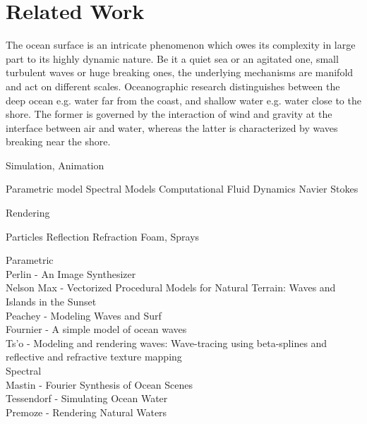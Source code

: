\chapter{Related Work}
\label{ch:state_of_the_art}

The ocean surface is an intricate phenomenon which owes its complexity in large part
to its highly dynamic nature. Be it a quiet sea or an agitated one, small turbulent waves
or huge breaking ones, the underlying mechanisms are manifold and act on different scales.
Oceanographic research distinguishes between the deep ocean e.g. water far from the coast,
and shallow water e.g. water close to the shore.  The former is governed by the interaction
of wind and gravity at the interface between air and water, whereas the latter is
characterized by waves breaking near the shore.

Simulation, Animation

Parametric model
Spectral Models
Computational Fluid Dynamics
Navier Stokes

Rendering

Particles
Reflection
Refraction
Foam, Sprays

Parametric\\
Perlin - An Image Synthesizer \cite{Perlin:1985}\\
Nelson Max - Vectorized Procedural Models for Natural Terrain: Waves and Islands in the Sunset \cite{Max:1981}\\
Peachey - Modeling Waves and Surf \cite{Peachey:1986}\\
Fournier - A simple model of ocean waves \cite{Fournier:1986}\\
Ts'o - Modeling and rendering waves: Wave-tracing using beta-splines and reflective and refractive texture mapping \cite{Ts'o:1987}\\

Spectral\\
Mastin - Fourier Synthesis of Ocean Scenes \cite{Mastin:1987}\\
Tessendorf - Simulating Ocean Water \cite{course:simulatingocean}\\
Premoze - Rendering Natural Waters \cite{Premoze:2000} \\

